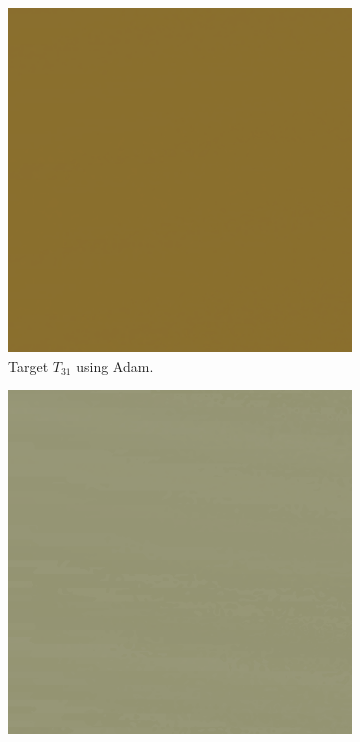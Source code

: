 \begin{figure}[h]
\centering
\begin{subfigure}[t]{.25\textwidth}
    \centering
    \includegraphics[width=\linewidth]{img/evaluation/M3/2 param/MSE_Adam_2_param_final.png}
    \caption{Target $T_{31}$ using Adam.}
    \label{fig:M3MSEFinalRendersTwoParamAdam}
\end{subfigure}\hspace{0.7cm}
\begin{subfigure}[t]{.25\textwidth}
    \centering
    \includegraphics[width=\linewidth]{img/evaluation/M3/random/MSE_Adam_random_final.png}

\end{subfigure}
\end{figure}
